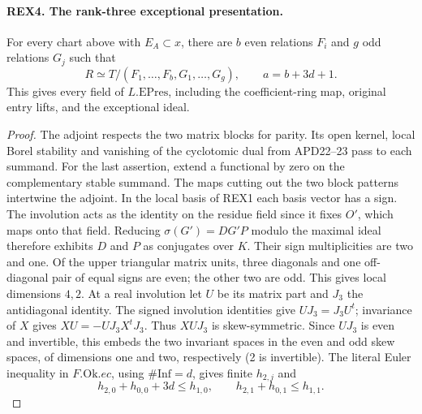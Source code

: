 \paragraph{REX4. The rank-three exceptional presentation.}
\label{claim:REX4}
For every chart above with \(E_A\subset x\), there are \(b\) even
relations \(F_i\) and \(g\) odd relations \(G_j\) such that
\[
 R\simeq T/(F_1,\ldots,F_b,G_1,\ldots,G_g),
 \qquad a=b+3d+1.
\]
This gives every field of \(L.\mathrm{EPres}\), including the
coefficient-ring map, original entry lifts, and the exceptional ideal.

\begin{proof}
The adjoint respects the two matrix blocks for parity. Its open
kernel, local Borel stability and vanishing of the cyclotomic dual
from APD22--23 pass to each summand. For the last assertion, extend
a functional by zero on the complementary stable summand. The maps
cutting out the two block patterns intertwine the adjoint. In the local
basis of REX1 each basis vector has a sign. The involution acts as
the identity on the residue field since it fixes \(O'\), which maps
onto that field. Reducing \(\sigma(G')=DG'P\) modulo the maximal
ideal therefore exhibits \(D\) and \(P\) as conjugates over \(K\).
Their sign multiplicities are two and one. Of the upper triangular matrix units, three
diagonals and one off-diagonal pair of equal signs are even; the
other two are odd. This gives local dimensions \(4,2\).
At a real involution let \(U\) be its matrix part and \(J_3\) the
antidiagonal identity. The signed involution identities give
\(UJ_3=J_3U^t\); invariance of \(X\) gives
\(XU=-UJ_3X^tJ_3\). Thus \(XUJ_3\) is skew-symmetric. Since
\(UJ_3\) is even and invertible, this embeds the two invariant
spaces in the even and odd skew spaces, of dimensions one and two,
respectively (2 is invertible). The literal Euler inequality in
\(F.\mathrm{Ok}.ec\), using \(\#\mathrm{Inf}=d\), gives finite
\(h_{2,j}\) and
\[
 h_{2,0}+h_{0,0}+3d\le h_{1,0},\qquad
 h_{2,1}+h_{0,1}\le h_{1,1}.
\]


\end{proof}
